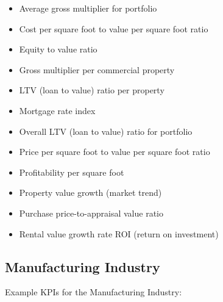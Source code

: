 \documentclass[]{book}
\providecommand{\tightlist}{%
  \setlength{\itemsep}{0pt}\setlength{\parskip}{0pt}}
\begin{document}
\begin{itemize}
\tightlist
\item
  Average gross multiplier for portfolio
\item
  Cost per square foot to value per square foot ratio
\item
  Equity to value ratio
\item
  Gross multiplier per commercial property
\item
  LTV (loan to value) ratio per property
\item
  Mortgage rate index
\item
  Overall LTV (loan to value) ratio for portfolio
\item
  Price per square foot to value per square foot ratio
\item
  Profitability per square foot
\item
  Property value growth (market trend)
\item
  Purchase price-to-appraisal value ratio
\item
  Rental value growth rate ROI (return on investment)
\end{itemize}

\subsection{Manufacturing Industry}\label{manufacturing-industry}

Example KPIs for the Manufacturing Industry:
\end{document}
